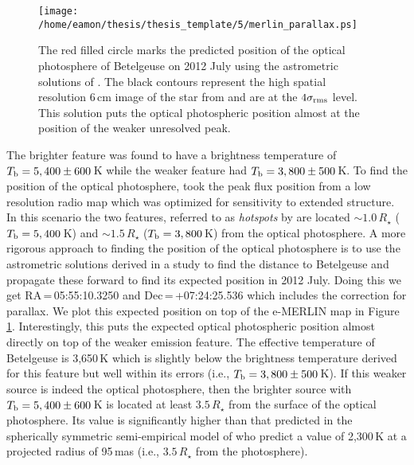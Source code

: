 \begin{figure}[!ht]
\centering 
          \texttt{[image: /home/eamon/thesis/thesis\_template/5/merlin\_parallax.ps]}
\caption[Predicted position of Betelgeuse on 2012 July]{The red filled circle marks the predicted position of the optical photosphere of Betelgeuse on 2012 July using the astrometric solutions of \cite{harper_2001}. The black contours represent the high spatial resolution 6\,cm image of the star from \cite{richards_2013} and are at the $4\sigma _{\rm{rms}}$ level. This solution puts the optical photospheric position almost at the position of the weaker unresolved peak.}
\label{fig:5.14}
\end{figure}

The brighter feature was found to have a brightness temperature of $T_{\rm{b}}=5,400\pm 600$\,K while the weaker feature had $T_{\rm{b}}=3,800\pm 500$\,K. To find the position of the optical photosphere, \cite{richards_2013} took the peak flux position from a low resolution radio map which was optimized for sensitivity to extended structure. In this scenario the two features, referred to as \textit{hotspots} by \cite{richards_2013} are located $\sim 1.0\,R_{\star}$  ($T_{\rm{b}}=5,400$\,K) and $\sim 1.5\,R_{\star}$ ($T_{\rm{b}}=3,800$\,K) from the optical photosphere. A more rigorous approach to finding the position of the optical photosphere is to use the astrometric solutions derived in a study to find the distance to Betelgeuse \citep[solution 5 in][]{harper_2008} and propagate these forward to find its expected position in 2012 July. Doing this we get RA\,=\,05:55:10.3250 and Dec\,=\,+07:24:25.536 which includes the correction for parallax. We plot this expected position on top of the e-MERLIN map in Figure \ref{fig:5.14}. Interestingly, this puts the expected optical photospheric position almost directly on top of the weaker emission feature. The effective temperature of Betelgeuse is 3,650\,K \citep{levesque_2005} which is slightly below the brightness temperature derived for this feature but well within its errors (i.e., $T_{\rm{b}}=3,800\pm 500$\,K). If this weaker source is indeed the optical photosphere, then the brighter source with $T_{\rm{b}}=5,400\pm 600$\,K is located at least $3.5\,R_{\star}$ from the surface of the optical photosphere. Its value is significantly higher than that predicted in the spherically symmetric semi-empirical model of \cite{harper_2001} who predict a value of 2,300\,K at a projected radius of 95\,mas (i.e., $3.5\,R_{\star}$ from the photosphere).

